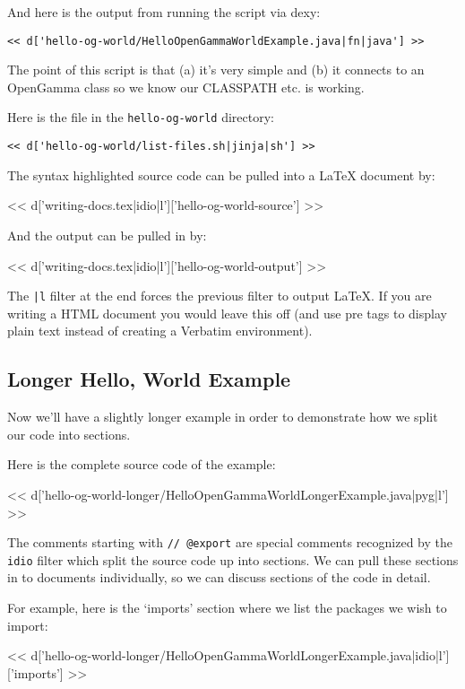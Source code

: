 And here is the output from running the script via dexy:

\begin{Verbatim}
<< d['hello-og-world/HelloOpenGammaWorldExample.java|fn|java'] >>
\end{Verbatim}

The point of this script is that (a) it's very simple and (b) it connects to an
OpenGamma class so we know our CLASSPATH etc. is working.

Here is the file in the \verb|hello-og-world| directory:

\begin{Verbatim}
<< d['hello-og-world/list-files.sh|jinja|sh'] >>
\end{Verbatim}

The syntax highlighted source code can be pulled into a LaTeX document by:

<< d['writing-docs.tex|idio|l']['hello-og-world-source'] >>

And the output can be pulled in by:

<< d['writing-docs.tex|idio|l']['hello-og-world-output'] >>

The \verb=|l= filter at the end forces the previous filter to output \LaTeX. If
you are writing a HTML document you would leave this off (and use \lt pre \gt tags to
display plain text instead of creating a Verbatim environment).

\subsection{Longer Hello, World Example}

Now we'll have a slightly longer example in order to demonstrate how we split
our code into sections.

Here is the complete source code of the example:

<< d['hello-og-world-longer/HelloOpenGammaWorldLongerExample.java|pyg|l'] >>

The comments starting with \verb|// @export| are special comments recognized
by the \verb|idio| filter which split the source code up into sections. We can
pull these sections in to documents individually, so we can discuss sections of
the code in detail.

For example, here is the `imports' section where we list the packages we wish to import:

<< d['hello-og-world-longer/HelloOpenGammaWorldLongerExample.java|idio|l']['imports'] >>

